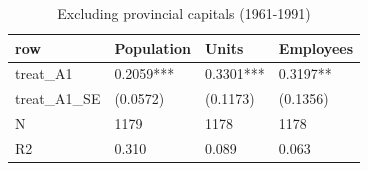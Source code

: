 \begin{table}

\caption{Excluding provincial capitals (1961-1991)}
\centering
\begin{tabular}[t]{llll}
\toprule
row & Population & Units & Employees\\
\midrule
treat\_A1 & 0.2059*** & 0.3301*** & 0.3197**\\
treat\_A1\_SE & (0.0572) & (0.1173) & (0.1356)\\
N & 1179 & 1178 & 1178\\
R2 & 0.310 & 0.089 & 0.063\\
\bottomrule
\end{tabular}
\end{table}
